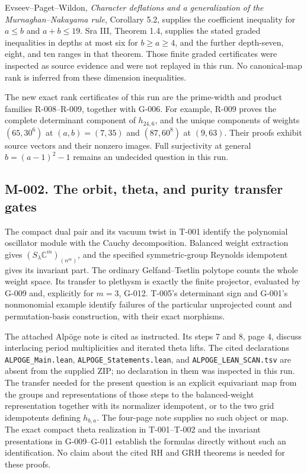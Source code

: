 \documentclass[
  10pt,
]{article}
\begin{document}
Evseev--Paget--Wildon, \emph{Character deflations and a generalization
of the Murnaghan--Nakayama rule}, Corollary 5.2, supplies the
coefficient inequality for \(a\le b\) and \(a+b\le19\). Sra III, Theorem
1.4, supplies the stated graded inequalities in depths at most six for
\(b\ge a\ge4\), and the further depth-seven, eight, and ten ranges in
that theorem. Those finite graded certificates were inspected as source
evidence and were not replayed in this run. No canonical-map rank is
inferred from these dimension inequalities.

The new exact rank certificates of this run are the prime-width and
product families R-008--R-009, together with G-006. For example, R-009
proves the complete determinant component of \(h_{24,6}\), and the
unique components of weights \((65,30^6)\) at \((a,b)=(7,35)\) and
\((87,60^8)\) at \((9,63)\). Their proofs exhibit source vectors and
their nonzero images. Full surjectivity at general \(b=(a-1)^2-1\)
remains an undecided question in this run.

\subsection{M-002. The orbit, theta, and purity transfer
gates}\label{m-002.-the-orbit-theta-and-purity-transfer-gates}

The compact dual pair and its vacuum twist in T-001 identify the
polynomial oscillator module with the Cauchy decomposition. Balanced
weight extraction gives \((S_\lambda\mathbb C^m)_{(n^m)}\), and the
specified symmetric-group Reynolds idempotent gives its invariant part.
The ordinary Gelfand--Tsetlin polytope counts the whole weight space.
Its transfer to plethysm is exactly the finite projector, evaluated by
G-009 and, explicitly for \(m=3\), G-012. T-005's determinant sign and
G-001's nonmonomial example identify failures of the particular
unprojected count and permutation-basis construction, with their exact
morphisms.

The attached Alpöge note is cited as instructed. Its steps 7 and 8, page
4, discuss interlacing period multiplicities and iterated theta lifts.
The cited declarations \texttt{\small ALPOGE\_\allowbreak{}Main.lean},
\texttt{\small ALPOGE\_\allowbreak{}Statements.lean}, and
\texttt{\small ALPOGE\_\allowbreak{}LEAN\_\allowbreak{}SCAN.tsv} are
absent from the supplied ZIP; no declaration in them was inspected in
this run. The transfer needed for the present question is an explicit
equivariant map from the groups and representations of those steps to
the balanced-weight representation together with its normalizer
idempotent, or to the two grid idempotents defining \(h_{b,a}\). The
four-page note supplies no such object or map. The exact compact theta
realization in T-001--T-002 and the invariant presentations in
G-009--G-011 establish the formulas directly without such an
identification. No claim about the cited RH and GRH theorems is needed
for these proofs.
\end{document}
